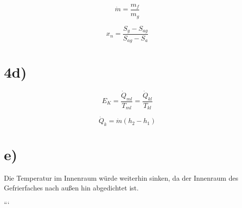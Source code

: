\[
\dot{m} = \frac{m_{f}}{m_{g}}
\]

\[
x_{n} = \frac{S_{g} - S_{ag}}{S_{ag} - S_{a}}
\]

\section*{4d)}
\[
E_{K} = \frac{\dot{Q}_{ml}}{T_{ml}} = \frac{\dot{Q}_{kl}}{T_{kl}}
\]

\[
\dot{Q}_{k} = \dot{m}(h_{2} - h_{1})
\]

\section*{e)}
Die Temperatur im Innenraum würde weiterhin sinken, da der Innenraum des Gefrierfaches nach außen hin abgedichtet ist.

```